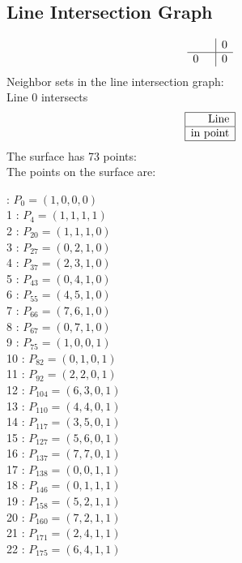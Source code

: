 \documentclass{article}
\begin{document}
{\subsection*{Line Intersection Graph}
{\arraycolsep=1pt
$$
\begin{array}{rr|*{1}r}
 &  & 0\\
\hline
0 &  & 0\\
\end{array}
$$
}%
Neighbor sets in the line intersection graph:\\
Line 0 intersects 
$$
\begin{array}{|r*{0}{|c}|}
\hline
\mbox{Line} \\
\hline
\mbox{in point} \\
\hline
\end{array}
$$
The surface has 73 points:\\
The points on the surface are:\\
\begin{multicols}{3}
 : $P_{0}=( 1, 0, 0, 0 )$\\
1 : $P_{4}=( 1, 1, 1, 1 )$\\
2 : $P_{20}=( 1, 1, 1, 0 )$\\
3 : $P_{27}=( 0, 2, 1, 0 )$\\
4 : $P_{37}=( 2, 3, 1, 0 )$\\
5 : $P_{43}=( 0, 4, 1, 0 )$\\
6 : $P_{55}=( 4, 5, 1, 0 )$\\
7 : $P_{66}=( 7, 6, 1, 0 )$\\
8 : $P_{67}=( 0, 7, 1, 0 )$\\
9 : $P_{75}=( 1, 0, 0, 1 )$\\
10 : $P_{82}=( 0, 1, 0, 1 )$\\
11 : $P_{92}=( 2, 2, 0, 1 )$\\
12 : $P_{104}=( 6, 3, 0, 1 )$\\
13 : $P_{110}=( 4, 4, 0, 1 )$\\
14 : $P_{117}=( 3, 5, 0, 1 )$\\
15 : $P_{127}=( 5, 6, 0, 1 )$\\
16 : $P_{137}=( 7, 7, 0, 1 )$\\
17 : $P_{138}=( 0, 0, 1, 1 )$\\
18 : $P_{146}=( 0, 1, 1, 1 )$\\
19 : $P_{158}=( 5, 2, 1, 1 )$\\
20 : $P_{160}=( 7, 2, 1, 1 )$\\
21 : $P_{171}=( 2, 4, 1, 1 )$\\
22 : $P_{175}=( 6, 4, 1, 1 )$\\

\end{multicols}}
\end{document}
